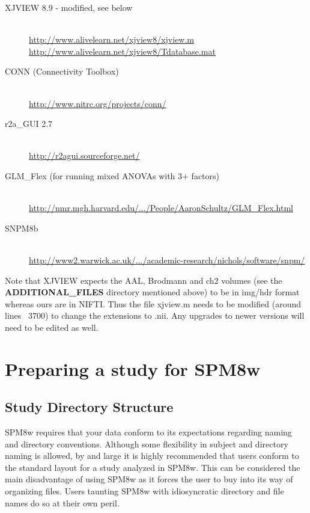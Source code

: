\documentclass[12pt]{article}
\begin{document}
\begin{description}
\item[XJVIEW 8.9 - modified, see below] \hfill \\ \href{http://www.alivelearn.net/xjview8/xjview.m}{http://www.alivelearn.net/xjview8/xjview.m} \\ \href{http://www.alivelearn.net/xjview8/Tdatabase.mat}{http://www.alivelearn.net/xjview8/Tdatabase.mat}
\item[CONN (Connectivity Toolbox)] \hfill \\ \href{http://www.nitrc.org/projects/conn/}{http://www.nitrc.org/projects/conn/}
\item[r2a\_GUI 2.7] \hfill \\ \href{http://r2agui.sourceforge.net/}{http://r2agui.sourceforge.net/}
\item[GLM\_Flex (for running mixed ANOVAs with 3+ factors)] \hfill \\ \href{http://nmr.mgh.harvard.edu/harvardagingbrain/People/AaronSchultz/GLM_Flex.html}{http://nmr.mgh.harvard.edu/.../People/AaronSchultz/GLM\_Flex.html}
\item[SNPM8b] \hfill \\ \href{http://www2.warwick.ac.uk/fac/sci/statistics/staff/academic-research/nichols/software/snpm/}{http://www2.warwick.ac.uk/.../academic-research/nichols/software/snpm/}
\end{description}

Note that XJVIEW expects the AAL, Brodmann and ch2 volumes (see the \\ \textbf{ADDITIONAL\_FILES} directory mentioned above) to be in img/hdr format whereas ours are in NIFTI. Thus the file xjview.m needs to be modified (around lines ~3700) to change the extensions to .nii. Any upgrades to newer versions will need to be edited as well.
\newpage

\section{Preparing a study for SPM8w}
\secttoc %
\subsection{Study Directory Structure}
SPM8w requires that your data conform to its expectations regarding naming and directory conventions. Although some flexibility in subject and directory naming is allowed, by and large it is highly recommended that users conform to the standard layout for a study analyzed in SPM8w. This can be considered the main disadvantage of using SPM8w as it forces the user to buy into its way of organizing files. Users taunting SPM8w with idiosyncratic directory and file names do so at their own peril. 
\vspace{\baselineskip}
\end{document}
